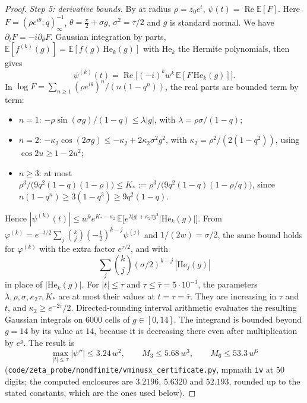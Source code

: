\documentclass[11pt]{article}
\theoremstyle{plain}
\theoremstyle{definition}
\theoremstyle{remark}
\theoremstyle{plain}\newtheorem*{maintheorem}{Main Theorem}
\begin{document}
\begin{proof}
\emph{Step 5: derivative bounds.} By {\cite[Lemma \textup{app:rep2}]{Bonfioli2026bB}} at radius $\rho=z_0e^t$,
$\psi(t)=\operatorname{Re}\mathbb E[F]$. Here $F=(\rho e^{i\theta};q)_\infty^{-1}$,
$\theta=\tfrac\pi2+\sigma g$, $\sigma^2=\tau/2$ and $g$ is standard normal. We have
$\partial_tF=-i\partial_\theta F$. Gaussian integration by parts,
$\mathbb E[f^{(k)}(g)]=\mathbb E[f(g)\,\mathrm{He}_k(g)]$ with $\mathrm{He}_k$ the Hermite
polynomials, then gives
\[
   \psi^{(k)}(t)=\operatorname{Re}\bigl[(-i)^kw^k\,\mathbb E[F\,\mathrm{He}_k(g)]\bigr].
\]
In $\log F=\sum_{n\ge1}(\rho e^{i\theta})^n/(n(1-q^n))$, the real parts are bounded term by term:
\begin{itemize}
\item $n=1$: $-\rho\sin(\sigma g)/(1-q)\le\lambda|g|$, with $\lambda=\rho\sigma/(1-q)$;
\item $n=2$: $-\kappa_2\cos(2\sigma g)\le-\kappa_2+2\kappa_2\sigma^2g^2$, with
$\kappa_2=\rho^2/(2(1-q^2))$, using $\cos2u\ge1-2u^2$;
\item $n\ge3$: at most $\rho^3/\bigl(9q^2(1-q)(1-\rho)\bigr)\le K_\ast:=\rho^3/\bigl(9q^2(1-q)(1-\rho/q)\bigr)$, since
$n(1-q^n)\ge3(1-q^3)\ge9q^2(1-q)$.
\end{itemize}
Hence
$|\psi^{(k)}(t)|\le w^ke^{K_\ast-\kappa_2}\,\mathbb E\bigl[e^{\lambda|g|+\kappa_2\tau g^2}
|\mathrm{He}_k(g)|\bigr]$. From
$\varphi^{(k)}=e^{-t/2}\sum_j\binom kj(-\tfrac12)^{k-j}\psi^{(j)}$ and $1/(2w)=\sigma/2$, the same
bound holds for $\varphi^{(k)}$ with the extra factor $e^{\tau/2}$, and with
\[
   \textstyle\sum_j\binom kj(\sigma/2)^{k-j}\,|\mathrm{He}_j(g)|
\]
in place of $|\mathrm{He}_k(g)|$. For $|t|\le\tau$
and $\tau\le\bar\tau=5\cdot10^{-3}$, the parameters $\lambda,\rho,\sigma,\kappa_2\tau,K_\ast$ are at
most their values at $t=\tau=\bar\tau$. They are increasing in $\tau$ and $t$, and
$\kappa_2\ge e^{-2\bar\tau}/2$. Directed-rounding interval arithmetic evaluates the resulting
Gaussian integrals on $6000$ cells of $g\in[0,14]$. The integrand is bounded beyond $g=14$ by its
value at $14$, because it is decreasing there even after multiplication by $e^g$. The result is
\[
   \max_{|t|\le\tau}|\psi''|\le3.24\,w^2,\qquad M_3\le5.68\,w^3,\qquad M_6\le53.3\,w^6
\]
(\texttt{code/zeta\_probe/nondfinite/vminusx\_certificate.py}, mpmath \texttt{iv} at $50$ digits;
the computed enclosures are $3.2196$, $5.6320$ and $52.193$, rounded up to the stated constants, which are the ones used below).


\end{proof}
\end{document}
